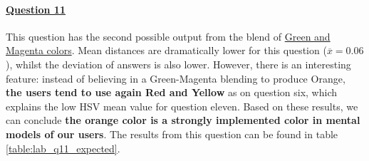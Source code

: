 \paragraph{\ul{Question 11}}
%
This question has the second possible output from the blend of \ul{Green and Magenta colors}. Mean distances are dramatically lower for this question ($\overline{x} = 0.06$),
whilst the deviation of answers is also lower. However, there is an interesting feature: instead of believing in a Green-Magenta blending to produce Orange, \textbf{the users tend to use again Red and Yellow} as on question six,
which explains the low HSV mean value for question eleven.
%
Based on these results, we can conclude \textbf{the orange color is a strongly implemented color in mental models of our users}. The results from this question can be found in table
\ref{table:lab_q11_expected}.
%
